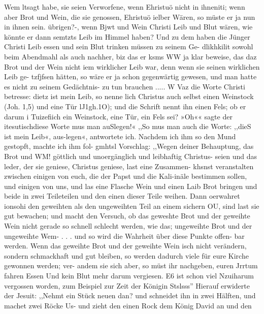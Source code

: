 Wem ltsagt habe, sie seien Verworfene, wenn Ehristuö nicht in
ihneniti; wenn aber Brot und Wein, die sie genossen, Ehristuö
ielber Wären, so müste er ja nun in ihnen sein. übrigen?-, wenn
Bjwt und Wein Christi Leib und Blut wären, wie könnte er dann
semtzts Leib im Himmel haben? Und zu dem haben die Jünger
Christi Leib essen und sein Blut trinken müssen zu seinem Ge-
dlikhkilit sowohl beim Abendmahl als auch nachher, biz das er
ksms WW ja klar beweise, das daz Brot und der Wein nicht
iem wirklicher Leib war, denn wenn sie seinen wirklichen Leib ge-
tzfjfsen hätten, so wäre er ja schon gegenwärtig gewesen, und man
hatte es nicht zu seinem Gedächtnis- zu tun brauchen .....
W Vaz die Worte Christi betresse: dietz ist mein Leib, so nenne
lich Christus auch selbst einen Weinstock (Joh. 1,5) und eine Tür
lJ1gh.1O); und die Schrift nennt ihn einen Fels; ob er darum
i Tuizefiich ein Weinstock, eine Tür, ein Fels sei? »Oh«« sagte der
itesutischdiese Worte mus man auSlegen!« ,,So mus man auch
die Worte: ,,dieS ist mein Leib«, aus-legen«, antwortete ich.
Nachdem ich ihm so den Mund gestopft, machte ich ihm fol-
gmhtsl Vorschlag: ,,Wegen deiner Behauptung, das Brot und
WM! göttlich und unoergänglich und leibhaftig Christus- seien und
das leder, der sie geniese, Christus geniese, last eine Zusammen-
khsnst veranstalten zwischen einigen von euch, die der Papst und
die Kali-inäle bestimmen sollen, und einigen von uns, und las eine
Flasche Wein und einen Laib Brot bringen und beide in zwei
Teileteilen und den einen dieser Teile weihen. Dann oerwahret
ionsohi den geweihten als den ungeweihten Teil an einem sichern
OU, sind last sie gut bewachen; und macht den Versuch, ob das
geweshte Brot und der geweihte Wein nicht gerade so schnell
schlecht werden, wie das; ungeweihte Brot und der ungeweihte
Wem- . . . und so wird die Wahrheit über diese Punkte offen-
bar werden. Wenn das geweihte Brot und der geweihte Wein
isch nicht verändern, sondern schmackhaft und gut bleiben, so
werden dadurch viele für eure Kirche gewonnen werden; ver-
andem sie sich aber, so müst ihr nachgeben, euren Jrrtum fahren
Essen Und kein Blut mehr darum vergiesen. E6 ist schon viel
Nzuiharum vergossen worden, zum Beispiel zur Zeit der Königin
Stslsss'' Hierauf erwiderte der Jesuit: ,,Nehmt ein Stück neuen
dan? und schneidet ihn in zwei Hälften, und machet zwei Röcke
Us- und zieht den einen Rock dem König David an und den


